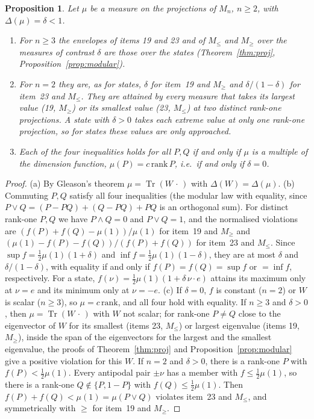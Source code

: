 \documentclass[11pt]{article}
\DeclareMathOperator{\Tr}{Tr}
\theoremstyle{plain}
\newtheorem{proposition}[theorem]{Proposition}
\theoremstyle{definition}
\theoremstyle{remark}
\begin{document}
\begin{proposition}\label{prop:measures}
Let $\mu$ be a measure on the projections of $M_n$, $n\ge2$, with $\Delta(\mu)=\delta<1$.
\begin{enumerate}
\item[(a)] For $n\ge3$ the envelopes of items 19 and 23 and of $M_\le$ and $M_\ge$ over the measures of contrast $\delta$
are those over the states (Theorem~\ref{thm:proj}, Proposition~\ref{prop:modular}).
\item[(b)] For $n=2$ they are, as for states, $\delta$ for item~19 and $M_\ge$ and $\delta/(1-\delta)$ for item~23 and
$M_\le$. They are attained by every measure that takes its largest value (19, $M_\ge$) or its smallest value (23, $M_\le$)
at two distinct rank-one projections. A state with $\delta>0$ takes each extreme value at only one rank-one projection,
so for states these values are only approached.
\item[(c)] Each of the four inequalities holds for all $P,Q$ if and only if $\mu$ is a multiple of the dimension function,
$\mu(P)=c\,\mathrm{rank}\,P$, i.e.\ if and only if $\delta=0$.
\end{enumerate}
\end{proposition}
\begin{proof}
(a) By Gleason's theorem $\mu=\Tr(W\,\cdot\,)$ with $\Delta(W)=\Delta(\mu)$. (b) Commuting $P,Q$ satisfy all four
inequalities (the modular law with equality, since $P\vee Q=(P-PQ)+(Q-PQ)+PQ$ is an orthogonal sum). For distinct rank-one $P,Q$ we have $P\wedge Q=0$ and $P\vee Q=1$, and the normalised
violations are $(f(P)+f(Q)-\mu(1))/\mu(1)$ for item~19 and $M_\ge$ and $(\mu(1)-f(P)-f(Q))/(f(P)+f(Q))$ for item~23 and
$M_\le$. Since $\sup f=\frac12\mu(1)(1+\delta)$ and $\inf f=\frac12\mu(1)(1-\delta)$, they are at most $\delta$ and
$\delta/(1-\delta)$, with equality if and only if $f(P)=f(Q)=\sup f$ or $=\inf f$, respectively. For a state,
$f(\nu)=\frac12\mu(1)(1+\delta\,\nu\cdot e)$ attains its maximum only at $\nu=e$ and its minimum only at $\nu=-e$.
(c) If $\delta=0$, $f$ is constant ($n=2$) or $W$ is scalar ($n\ge3$), so $\mu=c\,\mathrm{rank}$, and all four hold with
equality. If $n\ge3$ and $\delta>0$, then $\mu=\Tr(W\,\cdot\,)$ with $W$ not scalar; for rank-one $P\ne Q$ close to the
eigenvector of $W$ for its smallest (items 23, $M_\le$) or largest eigenvalue (items 19, $M_\ge$), inside the span of the
eigenvectors for the largest and the smallest eigenvalue, the proofs of Theorem~\ref{thm:proj} and
Proposition~\ref{prop:modular} give a positive violation for this $W$. If $n=2$ and $\delta>0$, there is a rank-one $P$
with $f(P)<\frac12\mu(1)$. Every antipodal pair $\pm\nu$ has a member with $f\le\frac12\mu(1)$, so there is a rank-one
$Q\notin\{P,1-P\}$ with $f(Q)\le\frac12\mu(1)$. Then $f(P)+f(Q)<\mu(1)=\mu(P\vee Q)$ violates item~23 and $M_\le$, and
symmetrically with $\ge$ for item~19 and $M_\ge$.
\end{proof}
\end{document}
